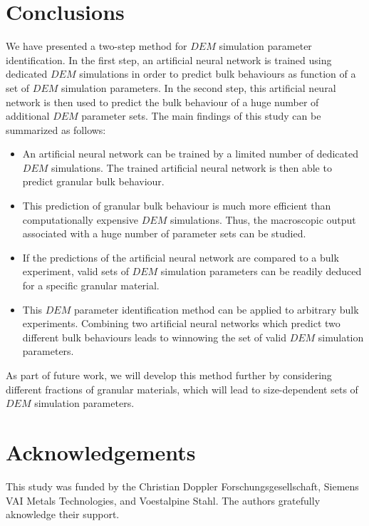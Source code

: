 \documentclass[review]{elsarticle}
\begin{document}
\section{Conclusions}
\label{sec:conclusions}
We have presented a two-step method for $DEM$ simulation parameter
identification. In the first step, an artificial neural network is 
trained using dedicated $DEM$ simulations in order to predict bulk 
behaviours as function of a set of $DEM$ simulation parameters. 
In the second step, this artificial neural network is then used 
to predict the bulk behaviour of a huge number of additional $DEM$ parameter
sets.
The main findings of this study can be summarized as follows:
\begin{itemize}
  \item{An artificial neural network can be trained by a limited number of
  dedicated $DEM$ simulations.
  		The trained artificial neural network is then able to predict
  		granular bulk behaviour.}
  \item{This prediction of granular bulk behaviour is much more efficient
  		than computationally expensive $DEM$ simulations.
  		Thus, the macroscopic output associated with a huge number of parameter sets
  		can be studied.}
  \item{If the predictions of the artificial neural network are compared to a bulk experiment, 
  		valid sets of $DEM$ simulation parameters can be readily deduced for a
  		specific granular material.}
  \item{This $DEM$ parameter identification method can be applied to
  arbitrary bulk experiments.
  		Combining two artificial neural networks which predict two different bulk
  		behaviours leads to winnowing the set of valid $DEM$ simulation parameters.}
\end{itemize}
As part of future work, we will develop this method further by considering
different fractions of granular materials, which will lead to size-dependent sets of $DEM$
simulation parameters.

\section{Acknowledgements}
This study was funded by the Christian Doppler Forschungsgesellschaft, Siemens
VAI Metals Technologies, and Voestalpine Stahl. The authors gratefully
aknowledge their support.
 

%
\end{document}
